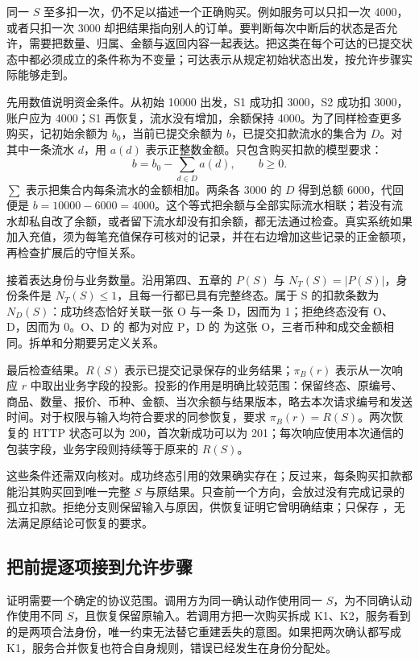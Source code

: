 同一 \(S\) 至多扣一次，仍不足以描述一个正确购买。例如服务可以只扣一次 4000，或者只扣一次 3000 却把结果指向别人的订单。要判断每次中断后的状态是否允许，需要把数量、归属、金额与返回内容一起表达。把这类在每个可达的已提交状态中都必须成立的条件称为不变量；可达表示从规定初始状态出发，按允许步骤实际能够走到。

先用数值说明资金条件。从初始 10000 出发，S1 成功扣 3000，S2 成功扣 3000，账户应为 4000；S1 再恢复，流水没有增加，余额保持 4000。为了同样检查更多购买，记初始余额为 \(b_0\)，当前已提交余额为 \(b\)，已提交扣款流水的集合为 \(D\)。对其中一条流水 \(d\)，用 \(a(d)\) 表示正整数金额。只包含购买扣款的模型要求：
\[
 b=b_0-\sum_{d\in D}a(d),\qquad b\geq0.
\]
\(\sum\) 表示把集合内每条流水的金额相加。两条各 3000 的 \(D\) 得到总额 6000，代回便是 \(b=10000-6000=4000\)。这个等式把余额与全部实际流水相联；若没有流水却私自改了余额，或者留下流水却没有扣余额，都无法通过检查。真实系统如果加入充值，须为每笔充值保存可核对的记录，并在右边增加这些记录的正金额项，再检查扩展后的守恒关系。

接着表达身份与业务数量。沿用第四、五章的 \(P(S)\) 与 \(N_T(S)=|P(S)|\)，身份条件是 \(N_T(S)\leq1\)，且每一行都已具有完整终态。属于 S 的扣款条数为 \(N_D(S)\)：成功终态恰好关联一张 O 与一条 D，因而为 1；拒绝终态没有 O、D，因而为 0。O、D 的  都为对应 P，D 的  为这张 O，三者币种和成交金额相同。拆单和分期要另定义关系。

最后检查结果。\(R(S)\) 表示已提交记录保存的业务结果；\(\pi_B(r)\) 表示从一次响应 \(r\) 中取出业务字段的投影。投影的作用是明确比较范围：保留终态、原编号、商品、数量、报价、币种、金额、当次余额与结果版本，略去本次请求编号和发送时间。对于权限与输入均符合要求的同参恢复，要求 \(\pi_B(r)=R(S)\)。两次恢复的 HTTP 状态可以为 200，首次新成功可以为 201；每次响应使用本次通信的包装字段，业务字段则持续等于原来的 \(R(S)\)。



这些条件还需双向核对。成功终态引用的效果确实存在；反过来，每条购买扣款都能沿其购买回到唯一完整 \(S\) 与原结果。只查前一个方向，会放过没有完成记录的孤立扣款。拒绝分支则保留输入与原因，供恢复证明它曾明确结束；只保存 ，无法满足原结论可恢复的要求。

\subsection*{把前提逐项接到允许步骤}

证明需要一个确定的协议范围。调用方为同一确认动作使用同一 \(S\)，为不同确认动作使用不同 \(S\)，且恢复保留原输入。若调用方把一次购买拆成 K1、K2，服务看到的是两项合法身份，唯一约束无法替它重建丢失的意图。如果把两次确认都写成 K1，服务合并恢复也符合自身规则，错误已经发生在身份分配处。

